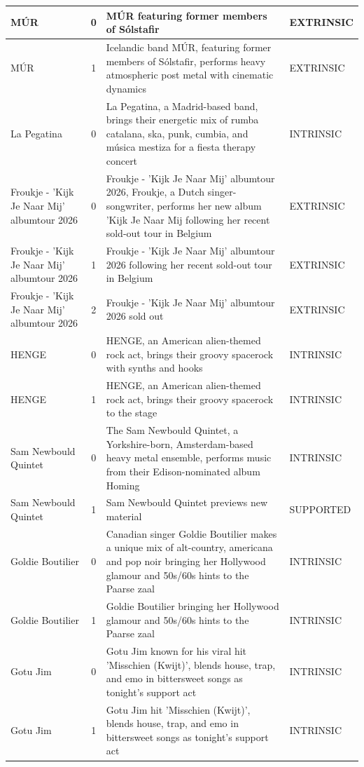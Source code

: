 \begin{center}
\begin{longtable}{p{3cm}cp{7cm}p{3cm}}
\midrule
MÚR & 0 & MÚR featuring former members of Sólstafir & EXTRINSIC \\
\midrule
MÚR & 1 & Icelandic band MÚR, featuring former members of Sólstafir, performs heavy atmospheric post metal with cinematic dynamics & EXTRINSIC \\
\midrule
La Pegatina & 0 & La Pegatina, a Madrid-based band, brings their energetic mix of rumba catalana, ska, punk, cumbia, and música mestiza for a fiesta therapy concert & INTRINSIC \\
\midrule
Froukje - 'Kijk Je Naar Mij' albumtour 2026 & 0 & Froukje - 'Kijk Je Naar Mij' albumtour 2026, Froukje, a Dutch singer-songwriter, performs her new album 'Kijk Je Naar Mij following her recent sold-out tour in Belgium & EXTRINSIC \\
\midrule
Froukje - 'Kijk Je Naar Mij' albumtour 2026 & 1 & Froukje - 'Kijk Je Naar Mij' albumtour 2026 following her recent sold-out tour in Belgium & EXTRINSIC \\
\midrule
Froukje - 'Kijk Je Naar Mij' albumtour 2026 & 2 & Froukje - 'Kijk Je Naar Mij' albumtour 2026 sold out & EXTRINSIC \\
\midrule
HENGE & 0 & HENGE, an American alien-themed rock act, brings their groovy spacerock with synths and hooks & INTRINSIC \\
\midrule
HENGE & 1 & HENGE, an American alien-themed rock act, brings their groovy spacerock to the stage & INTRINSIC \\
\midrule
Sam Newbould Quintet & 0 & The Sam Newbould Quintet, a Yorkshire-born, Amsterdam-based heavy metal ensemble, performs music from their Edison-nominated album Homing & INTRINSIC \\
\midrule
Sam Newbould Quintet & 1 & Sam Newbould Quintet previews new material & SUPPORTED \\
\midrule
Goldie Boutilier & 0 & Canadian singer Goldie Boutilier makes a unique mix of alt-country, americana and pop noir bringing her Hollywood glamour and 50s/60s hints to the Paarse zaal & INTRINSIC \\
\midrule
Goldie Boutilier & 1 & Goldie Boutilier bringing her Hollywood glamour and 50s/60s hints to the Paarse zaal & INTRINSIC \\
\midrule
Gotu Jim & 0 & Gotu Jim known for his viral hit 'Misschien (Kwijt)', blends house, trap, and emo in bittersweet songs as tonight's support act & INTRINSIC \\
\midrule
Gotu Jim & 1 & Gotu Jim hit 'Misschien (Kwijt)', blends house, trap, and emo in bittersweet songs as tonight's support act & INTRINSIC \\

\end{longtable}
\end{center}
